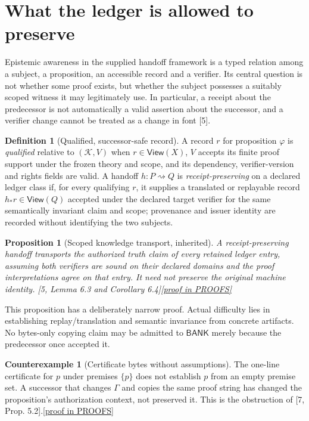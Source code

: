 \documentclass[11pt,letterpaper]{article}
\newtheorem{proposition}[theorem]{Proposition}
\theoremstyle{definition}
\newtheorem{definition}[theorem]{Definition}
\newtheorem{counterexample}[theorem]{Counterexample}
\theoremstyle{remark}
\newcommand{\K}{\mathcal K}
\newcommand{\View}{\mathsf{View}}
\newcommand{\Bank}{\mathsf{BANK}}
\newcommand{\prooflink}[1]{\hfill\hyperlink{proof:#1}{\footnotesize[proof in PROOFS]}}
\newcommand{\src}[1]{\textup{[#1]}}
\begin{document}
\section{What the ledger is allowed to preserve}
Epistemic awareness in the supplied handoff framework is a typed relation among a subject, a proposition, an accessible record and a verifier. Its central question is not whether some proof exists, but whether the subject possesses a suitably scoped witness it may legitimately use. In particular, a receipt about the predecessor is not automatically a valid assertion about the successor, and a verifier change cannot be treated as a change in font \src{5}.

\begin{definition}[Qualified, successor-safe record]\label{def:record}
A record $r$ for proposition $\varphi$ is \emph{qualified} relative to $(\K,V)$ when $r\in\View(X)$, $V$ accepts its finite proof support under the frozen theory and scope, and its dependency, verifier-version and rights fields are valid. A handoff $h:P\rightsquigarrow Q$ is \emph{receipt-preserving} on a declared ledger class if, for every qualifying $r$, it supplies a translated or replayable record $h_*r\in\View(Q)$ accepted under the declared target verifier for the same semantically invariant claim and scope; provenance and issuer identity are recorded without identifying the two subjects.
\end{definition}

\begin{proposition}[Scoped knowledge transport, inherited]\label{prop:transport}\hypertarget{claim:transport}{}
A receipt-preserving handoff transports the authorized truth claim of every retained ledger entry, assuming both verifiers are sound on their declared domains and the proof interpretations agree on that entry. It need not preserve the original machine identity. \src{5, Lemma 6.3 and Corollary 6.4}\prooflink{transport}
\end{proposition}

This proposition has a deliberately narrow proof. Actual difficulty lies in establishing replay/translation and semantic invariance from concrete artifacts. No bytes-only copying claim may be admitted to $\Bank$ merely because the predecessor once accepted it.

\begin{counterexample}[Certificate bytes without assumptions]\label{cex:scope}\hypertarget{claim:scope}{}
The one-line certificate for $p$ under premises $\{p\}$ does not establish $p$ from an empty premise set. A successor that changes $\Gamma$ and copies the same proof string has changed the proposition's authorization context, not preserved it. This is the obstruction of \src{7, Prop. 5.2}.\prooflink{scope}
\end{counterexample}
\end{document}
